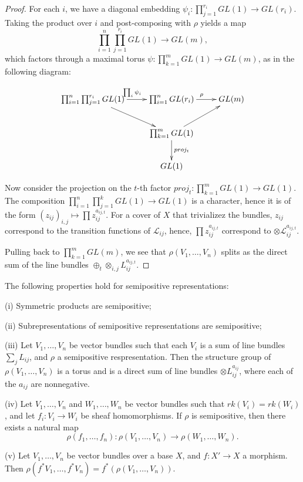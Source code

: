\begin{proof}
For each $i$, we have a diagonal embedding $\psi_i:\prod_{j=1}^{r_i}GL(1)\to GL(r_i)$.
Taking the product over $i$ and post-composing with $\rho$ yields a map
\begin{equation}
\prod_{i=1}^{n}\prod_{j=1}^{r_i}GL(1)\to GL(m),
\end{equation}
which factors through a maximal torus $\psi:\prod_{k=1}^{m}GL(1)\to GL(m)$, as in the following diagram:

$$\xymatrix{
\prod_{i=1}^{n}\prod_{j=1}^{r_i} GL(1)\ar[r]^{\prod_i\psi_i} \ar[rd] &\prod_{i=1}^{n}GL(r_i)\ar[r]^{\rho} &GL(m)\\
&\prod_{k=1}^{m}GL(1)\ar[ru]\ar[d]^{proj_t}&\\
&GL(1)&
}$$


Now consider the projection on the $t$-th factor $proj_t:\prod_{k=1}^mGL(1)\to GL(1)$. The composition $\prod_{i=1}^n\prod_{j=1}^{k} GL(1)\to GL(1)$ is a character, hence it is of the form $(z_{ij})_{i,j}\mapsto \prod z_{ij}^{a_{ij,t}}$. For a cover of $X$ that trivializez the bundles, $z_{ij}$ correspond to the transition functions of $\mathcal{L}_{ij}$, hence, $\prod z_{ij}^{a_{ij,t}}$ correspond to $\otimes\mathcal{L}_{ij}^{a_{ij,t}}$.

Pulling back to $\prod_{k=1}^{m} GL(m)$, we see that $\rho(V_1,\ldots,V_n)$ splits as the direct sum of the line bundles  $\oplus_t \otimes_{i,j}L_{ij}^{a_{ij,t}}$.

\end{proof}

\begin{lemma}
The following properties hold for semipositive representations:
\item[(i)] Symmetric products are semipositive;
\item[(ii)] Subrepresentations of semipositive representations are semipositive;
\item[(iii)] Let $V_1,\dots, V_n$ be vector bundles such that each $V_i$ is a sum of line bundles $\sum_j L_{ij}$, and $\rho$ a semipositive respresentation. Then the structure group of $\rho(V_1,\dots, V_n)$ is a torus and is a direct sum of line bundles $\otimes L_{ij}^{a_{ij}}$, where each of the $a_{ij}$ are nonnegative.
\item[(iv)] Let $V_1,\dots, V_n$ and $W_1,\dots, W_n$ be vector bundles such that $rk (V_i)=rk(W_i)$, and let $f_i: V_i\rightarrow W_i$ be sheaf homomorphisms. If $\rho$ is semipositive, then there exists a natural map 
$$\rho(f_1,\dots, f_n):\rho(V_1,\dots, V_n)\rightarrow \rho(W_1,\dots,W_n).$$
\item[(v)] Let $V_1,\dots, V_n$ be vector bundles over a base $X$, and $f:X'\rightarrow X$ a morphism. Then $\rho(f^*V_1,\dots,f^*V_n)=f^*(\rho(V_1,\dots,V_n))$.
\end{lemma}


